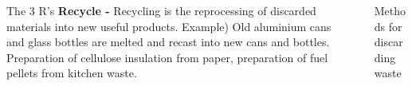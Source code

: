 \documentclass[final]{beamer}
\newlength{\sepwid}
\newlength{\onecolwid}
\newlength{\twocolwid}
\begin{document}
\begin{frame}
\begin{columns}[t]
\begin{column}{\twocolwid}
\begin{columns}[t,totalwidth=\twocolwid]
\begin{column}{\onecolwid}
\begin{exampleblock}{The 3 R's}
\textbf{Recycle - } Recycling is the reprocessing of discarded materials into new useful products. Example) Old aluminium cans and glass bottles are melted and recast into new cans and bottles. Preparation of cellulose insulation from paper, preparation of fuel pellets from kitchen waste.

\end{exampleblock}


\end{column} %
\begin{column}{\sepwid}\end{column} %

\begin{column}{\onecolwid}\vspace{-.74in} %


\begin{exampleblock}{Methods for discarding waste}


\end{exampleblock}
\end{column}
\end{columns}
\end{column}
\end{columns}
\end{frame}
\end{document}
